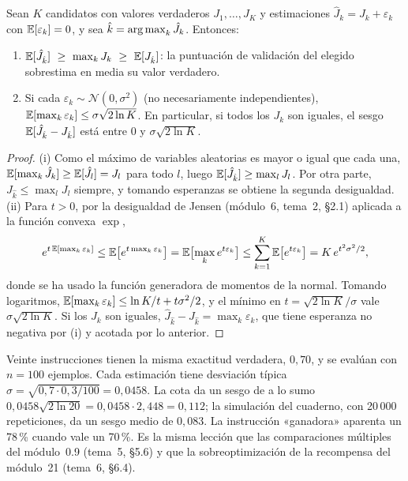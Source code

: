 \begin{proposicion}\label{prop:maldicion}
Sean $K$ candidatos con valores verdaderos $J_1,\dots,J_K$ y estimaciones $\hat J_k=J_k+\varepsilon_k$ con $\mathbb{E}[\varepsilon_k]=0$, y sea $\hat k=\operatorname*{arg\,max}_k\hat J_k$. Entonces:
\begin{enumerate}
  \item $\E[\hat J_{\hat k}]\ \ge\ \max_k J_k\ \ge\ \E[J_{\hat k}]$: la puntuación de validación del elegido sobrestima en media su valor verdadero.
  \item Si cada $\varepsilon_k\sim\mathcal{N}(0,\sigma^{2})$ (no necesariamente independientes), $\mathbb{E}[\max_k\varepsilon_k]\le\sigma\sqrt{2\ln K}$. En particular, si todos los $J_k$ son iguales, el sesgo $\mathbb{E}[\hat J_{\hat k}-J_{\hat k}]$ está entre $0$ y $\sigma\sqrt{2\ln K}$.
\end{enumerate}
\end{proposicion}

\begin{proof}
(i) Como el máximo de variables aleatorias es mayor o igual que cada una, $\mathbb{E}[\max_k\hat J_k]\ge\mathbb{E}[\hat J_l]=J_l$ para todo $l$, luego $\mathbb{E}[\hat J_{\hat k}]\ge\max_l J_l$. Por otra parte, $J_{\hat k}\le\max_l J_l$ siempre, y tomando esperanzas se obtiene la segunda desigualdad. (ii) Para $t>0$, por la desigualdad de Jensen (módulo~6, tema~2, §2.1) aplicada a la función convexa $\exp$,
\[
e^{t\,\mathbb{E}[\max_k\varepsilon_k]}\le\mathbb{E}\bigl[e^{t\max_k\varepsilon_k}\bigr]=\mathbb{E}\bigl[\max_k e^{t\varepsilon_k}\bigr]\le\sum_{k=1}^{K}\mathbb{E}\bigl[e^{t\varepsilon_k}\bigr]=K\,e^{t^{2}\sigma^{2}/2},
\]
donde se ha usado la función generadora de momentos de la normal. Tomando logaritmos, $\mathbb{E}[\max_k\varepsilon_k]\le\ln K/t+t\sigma^{2}/2$, y el mínimo en $t=\sqrt{2\ln K}/\sigma$ vale $\sigma\sqrt{2\ln K}$. Si los $J_k$ son iguales, $\hat J_{\hat k}-J_{\hat k}=\max_k\varepsilon_k$, que tiene esperanza no negativa por (i) y acotada por lo anterior.
\end{proof}

\begin{ejemplo}\label{ej:maldicion}
Veinte instrucciones tienen la misma exactitud verdadera, $0{,}70$, y se evalúan con $n=100$ ejemplos. Cada estimación tiene desviación típica $\sigma=\sqrt{0{,}7\cdot0{,}3/100}=0{,}0458$. La cota da un sesgo de a lo sumo $0{,}0458\sqrt{2\ln 20}=0{,}0458\cdot 2{,}448=0{,}112$; la simulación del cuaderno, con 20\,000 repeticiones, da un sesgo medio de $0{,}083$. La instrucción «ganadora» aparenta un 78\,\% cuando vale un 70\,\%. Es la misma lección que las comparaciones múltiples del módulo~0.9 (tema~5, §5.6) y que la sobreoptimización de la recompensa del módulo~21 (tema~6, §6.4).
\end{ejemplo}

